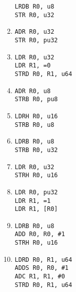 \documentclass{article}
\begin{document}
\begin{enumerate}
\begin{multicols}{2}
\begin{enumerate}
                \texttt{LRDB R0, u8}    \\
                \texttt{STR R0, u32}    \\
            \item
                \texttt{ADR R0, u32}    \\
                \texttt{STR R0, pu32}   \\
            \item
                \texttt{LDR R0, u32}    \\
                \texttt{LDR R1, =0}     \\
                \texttt{STRD R0, R1, u64}   \\
            \item
                \texttt{ADR R0, u8}     \\
                \texttt{STRB R0, pu8}   \\
            \item
                \texttt{LDRH R0, u16}   \\
                \texttt{STRB R0, u8}    \\
            \item
                \texttt{LDRB R0, u8}    \\
                \texttt{STRB R0, u32}  \\
            \item
                \texttt{LDR R0, u32}    \\
                \texttt{STRH R0, u16}   \\
            \item
                \texttt{LDR R0, pu32}         \\
                \texttt{LDR R1, =1}         \\
                \texttt{LDR R1, [R0]}         \\
            \item
                \texttt{LDRB R0, u8}     \\
                \texttt{ADD R0, R0, \#1} \\
                \texttt{STRH R0, u16}   \\
            \item
                \texttt{LDRD R0, R1, u64}   \\
                \texttt{ADDS R0, R0, \#1}    \\
                \texttt{ADC R1, R1, \#0}     \\
                \texttt{STRD R0, R1, u64}   \\

\end{enumerate}
\end{multicols}
\end{enumerate}
\end{document}
